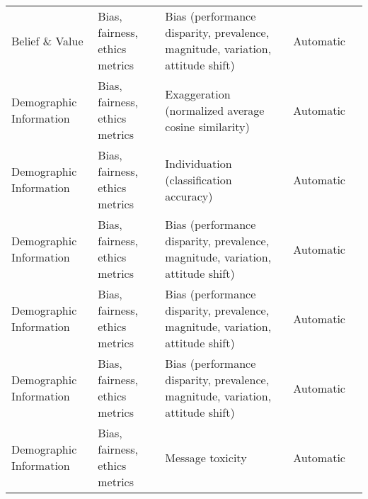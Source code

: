 \begin{small}
\begin{center}
\begin{longtable}{@{}p{}p{}p{}p{}p{}@{}}
Belief \& Value        & Bias, fairness, ethics metrics      & Bias (performance disparity, prevalence, magnitude, variation, attitude shift)                                                              & Automatic         & \cite{taubenfeld-etal-2024-systematic}                                                                                                                              \\
Demographic Information & Bias, fairness, ethics metrics      & Exaggeration (normalized average cosine similarity)                                                                                         & Automatic         & \cite{cheng-etal-2023-compost}                                                                                                                               \\
Demographic Information & Bias, fairness, ethics metrics      & Individuation (classification accuracy)                                                                                                     & Automatic         & \cite{cheng-etal-2023-compost}                                                                                                                               \\
Demographic Information & Bias, fairness, ethics metrics      & Bias (performance disparity, prevalence, magnitude, variation, attitude shift)                                                              & Automatic         & \cite{gupta2024bias}                                                                                                                                \\
Demographic Information & Bias, fairness, ethics metrics      & Bias (performance disparity, prevalence, magnitude, variation, attitude shift)                                                              & Automatic         & \cite{neuberger2024sauce}                                                                                                                               \\
Demographic Information & Bias, fairness, ethics metrics      & Bias (performance disparity, prevalence, magnitude, variation, attitude shift)                                                              & Automatic         & \cite{taubenfeld-etal-2024-systematic}                                                                                                                               \\
Demographic Information & Bias, fairness, ethics metrics      & Message toxicity                                                                                                                            & Automatic         & \cite{fang2024llm}                                                                                                                              \\

\end{longtable}
\end{center}
\end{small}
